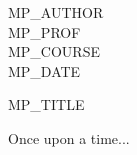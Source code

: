 \documentclass[12pt]{article}
\begin{document}
  \singlespacing
  \begin{flushleft}
    {MP_AUTHOR}\\
    {MP_PROF}\\
    {MP_COURSE}\\
    {MP_DATE}\\
  \end{flushleft}

  \doublespacing
  \begin{center}
    {MP_TITLE}
  \end{center}

  Once upon a time...
\end{document}
